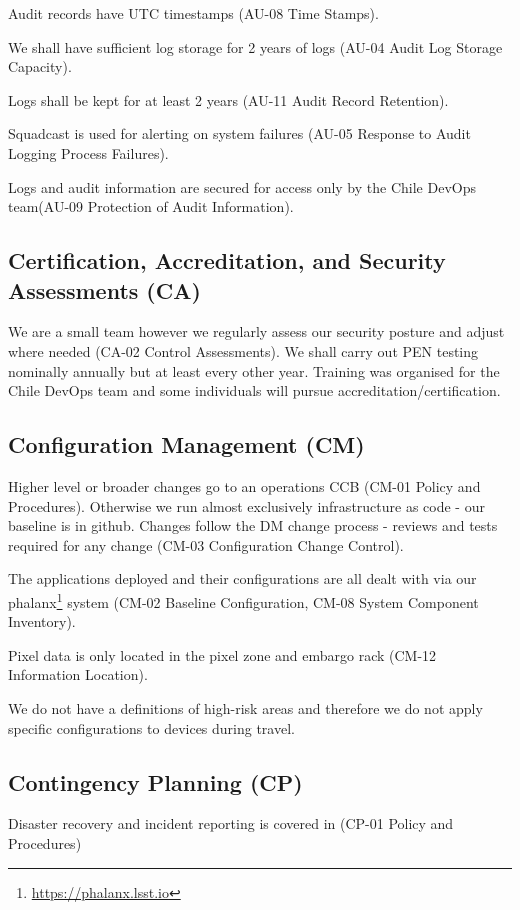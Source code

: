 Audit records have UTC timestamps (AU-08  Time Stamps).

We shall have sufficient log storage for 2 years of logs (AU-04  Audit Log Storage Capacity).

Logs shall be kept for at least 2 years (AU-11  Audit Record Retention).

Squadcast is used for alerting on system failures (AU-05  Response to Audit Logging Process Failures).

Logs and audit information are secured for access only by the Chile DevOps team(AU-09  Protection of Audit Information).


\subsection{Certification, Accreditation, and Security Assessments (CA)} \label{sec:CA}
We are a small team however we regularly assess our security posture and adjust where needed (CA-02  Control Assessments).
We shall carry out PEN testing nominally annually but at least every other year.
Training was organised for the Chile DevOps team and some individuals will pursue accreditation/certification.

\subsection{Configuration Management (CM)} \label{sec:CM}

Higher level or broader changes go to an operations CCB  (CM-01  Policy and Procedures).
Otherwise we run almost exclusively infrastructure as code - our baseline is in github.
Changes follow the DM change process - reviews and tests required for any change (CM-03  Configuration Change Control).


The applications deployed and their configurations are all dealt with via our phalanx\footnote{\url{https://phalanx.lsst.io}} system (CM-02  Baseline Configuration, CM-08  System Component Inventory).

Pixel data is only located in the pixel zone and embargo rack (CM-12  Information Location).


We do not have a definitions of high-risk areas and therefore we do not apply specific configurations to devices during travel.

\subsection{Contingency Planning (CP)} \label{sec:CP}
Disaster recovery and incident reporting is covered in  (CP-01  Policy and Procedures)

